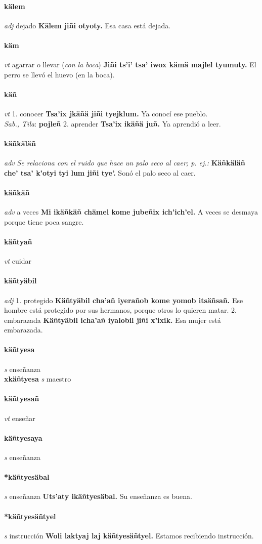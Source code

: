\documentclass{scrbook}
\newcommand{\entry}[1]{\paragraph{#1}}
\newcommand{\onedefinition}[1]{#1.}
\newcommand{\nontranslationdef}[1]{\textit{#1}}
\newcommand{\partofspeech}[1]{\textit{#1}}
\newcommand{\spanishtranslation}[1]{#1}
\newcommand{\clarification}[1]{(\textit{#1})}
\newcommand{\cholexample}[1]{\textbf{#1}}
\newcommand{\exampletranslation}[1]{#1}
\newcommand{\dialectvariant}[1]{\\\textit{#1}:}
\newcommand{\dialectword}[1]{\textbf{#1}}
\newcommand{\secondaryentry}[1]{\\\textbf{#1}}
\newcommand{\secondpartofspeech}[1]{\textit{#1}}
\newcommand{\secondtranslation}[1]{#1}
\begin{document}
\begin{multicols}{2}
\entry{kälem}
\partofspeech{adj}
\spanishtranslation{dejado}
\cholexample{Kälem jiñi otyoty.}
\exampletranslation{Esa casa está dejada.}

\entry{käm}
\partofspeech{vt}
\spanishtranslation{agarrar o llevar}
\clarification{con la boca}
\cholexample{Jiñi ts'i' tsa' iwox kämä majlel tyumuty.}
\exampletranslation{El perro se llevó el huevo (en la boca).}

\entry{käñ}
\partofspeech{vt}
\onedefinition{1}
\spanishtranslation{conocer}
\cholexample{Tsa'ix jkäñä jiñi tyejklum.}
\exampletranslation{Ya conocí ese pueblo.}
\dialectvariant{Sab., Tila}
\dialectword{pojleñ}
\onedefinition{2}
\spanishtranslation{aprender}
\cholexample{Tsa'ix ikäñä juñ.}
\exampletranslation{Ya aprendió a leer.}

\entry{käñkäläñ}
\partofspeech{adv}
\nontranslationdef{Se relaciona con el ruido que hace un palo seco al caer; p. ej.:}
\cholexample{Käñkäläñ che' tsa' k'otyi tyi lum jiñi tye'.}
\exampletranslation{Sonó el palo seco al caer.}

\entry{käñkäñ}
\partofspeech{adv}
\spanishtranslation{a veces}
\cholexample{Mi ikäñkäñ chämel kome jubeñix ich'ich'el.}
\exampletranslation{A veces se desmaya porque tiene poca sangre.}

\entry{käñtyañ}
\partofspeech{vt}
\spanishtranslation{cuidar}

\entry{käñtyäbil}
\partofspeech{adj}
\onedefinition{1}
\spanishtranslation{protegido}
\cholexample{Käñtyäbil cha'añ iyerañob kome yomob itsäñsañ.}
\exampletranslation{Ese hombre está protegido por sus hermanos, porque otros lo quieren matar.}
\onedefinition{2}
\spanishtranslation{embarazada}
\cholexample{Käñtyäbil icha'añ iyalobil jiñi x'ixik.}
\exampletranslation{Esa mujer está embarazada.}

\entry{käñtyesa}
\partofspeech{s}
\spanishtranslation{enseñanza}
\secondaryentry{xkäñtyesa}
\secondpartofspeech{s}
\secondtranslation{maestro}

\entry{käñtyesañ}
\partofspeech{vt}
\spanishtranslation{enseñar}

\entry{käñtyesaya}
\partofspeech{s}
\spanishtranslation{enseñanza}

\entry{*käñtyesäbal}
\partofspeech{s}
\spanishtranslation{enseñanza}
\cholexample{Uts'aty ikäñtyesäbal.}
\exampletranslation{Su enseñanza es buena.}

\entry{*käñtyesäñtyel}
\partofspeech{s}
\spanishtranslation{instrucción}
\cholexample{Woli laktyaj laj käñtyesäñtyel.}
\exampletranslation{Estamos recibiendo instrucción.}


\end{multicols}
\end{document}
